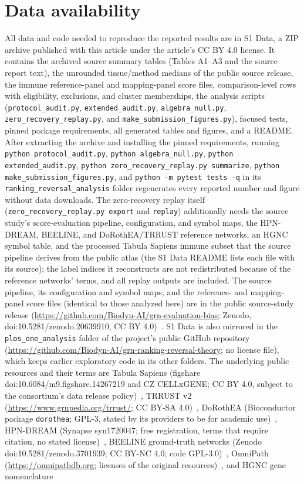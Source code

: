 \documentclass[10pt,letterpaper]{article}
\begin{document}
\section*{Data availability}
All data and code needed to reproduce the reported results are in S1 Data, a ZIP archive published with this article under the article's CC BY 4.0 license. It contains the archived source summary tables (Tables A1--A3 and the source report text), the unrounded tissue/method medians of the public source release, the immune reference-panel and mapping-panel score files, comparison-level rows with eligibility, exclusions, and cluster memberships, the analysis scripts (\texttt{protocol\_audit.py}, \texttt{extended\_audit.py}, \texttt{algebra\_null.py}, \texttt{zero\_recovery\_replay.py}, and \texttt{make\_submission\_figures.py}), focused tests, pinned package requirements, all generated tables and figures, and a README. After extracting the archive and installing the pinned requirements, running \texttt{python protocol\_audit.py}, \texttt{python algebra\_null.py}, \texttt{python extended\_audit.py}, \texttt{python zero\_recovery\_replay.py summarize}, \texttt{python make\_submission\_figures.py}, and \texttt{python -m pytest tests -q} in its \texttt{ranking\_reversal\_analysis} folder regenerates every reported number and figure without data downloads. The zero-recovery replay itself (\texttt{zero\_recovery\_replay.py export} and \texttt{replay}) additionally needs the source study's score-evaluation pipeline, configuration, and symbol maps, the HPN-DREAM, BEELINE, and DoRothEA/TRRUST reference networks, an HGNC symbol table, and the processed Tabula Sapiens immune subset that the source pipeline derives from the public atlas (the S1 Data README lists each file with its source); the label indices it reconstructs are not redistributed because of the reference networks' terms, and all replay outputs are included. The source pipeline, its configuration and symbol maps, and the reference- and mapping-panel score files (identical to those analyzed here) are in the public source-study release (\url{https://github.com/Biodyn-AI/grn-evaluation-bias}; Zenodo, doi:10.5281/zenodo.20639910, CC BY 4.0)~\cite{kendiukhov2026evalrelease}. S1 Data is also mirrored in the \texttt{plos\_one\_analysis} folder of the project's public GitHub repository (\url{https://github.com/Biodyn-AI/grn-ranking-reversal-theory}; no license file), which keeps earlier exploratory code in its other folders. The underlying public resources and their terms are Tabula Sapiens (figshare doi:10.6084/m9.figshare.14267219 and CZ CELLxGENE; CC BY 4.0, subject to the consortium's data release policy)~\cite{tabula2022}, TRRUST v2 (\url{https://www.grnpedia.org/trrust/}; CC BY-SA 4.0)~\cite{han2018trrust}, DoRothEA (Bioconductor package \texttt{dorothea}; GPL-3, stated by its providers to be for academic use)~\cite{garciaalonso2019dorothea}, HPN-DREAM (Synapse syn1720047; free registration, terms that require citation, no stated license)~\cite{hill2016hpndream}, BEELINE ground-truth networks (Zenodo doi:10.5281/zenodo.3701939; CC BY-NC 4.0; code GPL-3.0)~\cite{pratapa2020beeline}, OmniPath (\url{https://omnipathdb.org}; licenses of the original resources)~\cite{turei2021omnipath}, and HGNC gene nomenclature 
\end{document}
